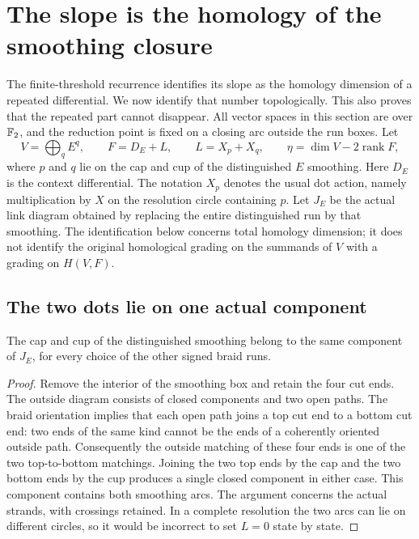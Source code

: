 \section{The slope is the homology of the smoothing closure}
\label{slope-section}

The finite-threshold recurrence identifies its slope as the homology dimension
of a repeated differential. We now identify that number topologically. This
also proves that the repeated part cannot disappear. All vector spaces in this
section are over $\mathbb F_2$, and the reduction point is fixed on a closing arc
outside the run boxes. Let
\[
 V=\bigoplus_q E^q,\qquad F=D_E+L,\qquad
 L=X_p+X_q,\qquad
 \eta=\dim V-2\operatorname{rank}F,
\]
where $p$ and $q$ lie on the cap and cup of the distinguished $E$ smoothing.
Here $D_E$ is the context differential. The notation $X_p$ denotes the
usual dot action, namely multiplication by $X$ on the resolution circle
containing $p$. Let $J_E$ be the actual link diagram obtained by replacing
the entire distinguished run by that smoothing. The identification below
concerns total homology dimension; it does not identify the original
homological grading on the summands of $V$ with a grading on $H(V,F)$.

\subsection{The two dots lie on one actual component}

\begin{lemma}\label{slope-cap-cup}
The cap and cup of the distinguished smoothing belong to the same component
of $J_E$, for every choice of the other signed braid runs.
\end{lemma}

\begin{proof}
Remove the interior of the smoothing box and retain the four cut ends. The
outside diagram consists of closed components and two open paths. The braid
orientation implies that each open path joins a top cut end to a bottom
cut end: two ends of the same kind cannot be the ends of a coherently
oriented outside path. Consequently the outside matching of these four ends is
one of the two top-to-bottom matchings. Joining the two top ends by the cap
and the two bottom ends by the cup produces a single closed component in
either case. This component contains both smoothing arcs. The argument
concerns the actual strands, with crossings retained. In a complete
resolution the two arcs can lie on different circles, so it would be
incorrect to set $L=0$ state by state.
\end{proof}

